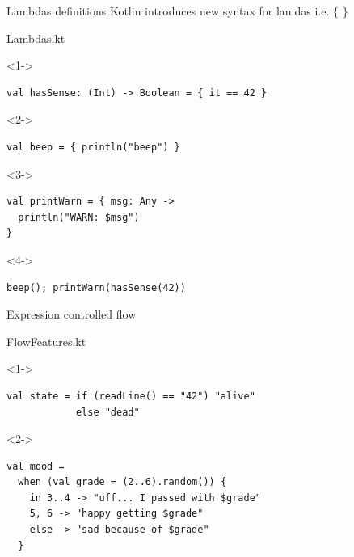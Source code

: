 \documentclass[hyperref={pdfpagelabels=false},xcolor={dvipsnames},compress]{beamer}
\begin{document}
    \begin{frame}[fragile]{Lambdas definitions}
        Kotlin introduces new syntax for lamdas i.e. $\lbrace$ $\rbrace$
        \begin{exampleblock}{Lambdas.kt}
            \begin{onlyenv}<1->
                \begin{lstlisting}
val hasSense: (Int) -> Boolean = { it == 42 }
                \end{lstlisting}
            \end{onlyenv}
            \begin{onlyenv}<2->
                \begin{lstlisting}
val beep = { println("beep") }
                \end{lstlisting}
            \end{onlyenv}
            \begin{onlyenv}<3->
                \begin{lstlisting}
val printWarn = { msg: Any -> 
  println("WARN: $msg")
}
                \end{lstlisting}
            \end{onlyenv}
            \begin{onlyenv}<4->
                \begin{lstlisting}
beep(); printWarn(hasSense(42))
                \end{lstlisting}
            \end{onlyenv}
        \end{exampleblock}
    \end{frame}

    \begin{frame}[fragile]{Expression controlled flow}
        \begin{exampleblock}{FlowFeatures.kt}
            \begin{onlyenv}<1->
                \begin{lstlisting}
val state = if (readLine() == "42") "alive"
            else "dead"

                \end{lstlisting}
            \end{onlyenv}
            \begin{onlyenv}<2->
                \begin{lstlisting}
val mood =
  when (val grade = (2..6).random()) {
    in 3..4 -> "uff... I passed with $grade"
    5, 6 -> "happy getting $grade"
    else -> "sad because of $grade"
  }
                \end{lstlisting}
            \end{onlyenv}
        \end{exampleblock}
    \end{frame}
\end{document}
